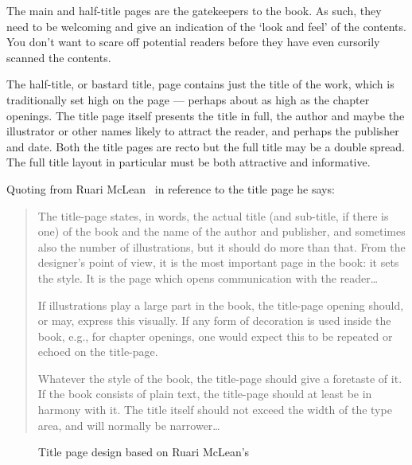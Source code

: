 \documentclass[10pt,a4paper,oneside,extrafontsizes]{memoir}%
\begin{document}
\begin{paracol}{2}
\switchEng
    The main and half-title pages are the gatekeepers to the book. As such,
they need to be welcoming and give an indication of the `look and feel'
of the contents. You don't want to scare off potential readers before they
have even cursorily scanned the contents.

    The half-title, or bastard 
title, page contains just the 
title of the
work, which is traditionally set high on the page --- perhaps about as high
as the chapter openings. The title page 
itself presents the title in full, 
the author and maybe the illustrator or
other names likely to attract the reader, and perhaps the publisher and date.
Both the title pages are recto but the full title may be a double spread.
The full title layout in particular must be both attractive and informative.

    Quoting from Ruari McLean~\autocite[p. 148]{MCLEAN80} in reference to the 
title page he says:
\begin{quotation}
    The title-page states, in words, the actual title (and sub-title, if 
there is one) of the book and the name of the author and publisher, and
sometimes also the number of illustrations, but it should do more than that.
From the designer's point of view, it is the most important page in the
book: it sets the style. It is the page which opens communication with the
reader\ldots

    If illustrations play a large part in the book, the title-page opening 
should, or may, express this visually. If any form of decoration is used 
inside the book, e.g., for chapter openings, one would expect this to be
repeated or echoed on the title-page.

    Whatever the style of the book, the title-page should give a foretaste
of it. If the book consists of plain text, the title-page should at least 
be in harmony with it. The title itself should not exceed the width of the
type area, and will normally be narrower\ldots
\end{quotation}
\end{paracol}

\begin{figure}
\centering
\begin{showtitle}
\titleJT
\end{showtitle}
\caption{Title page design based on Ruari McLean's } \label{fig:titleJT}
\end{figure}
\end{document}
